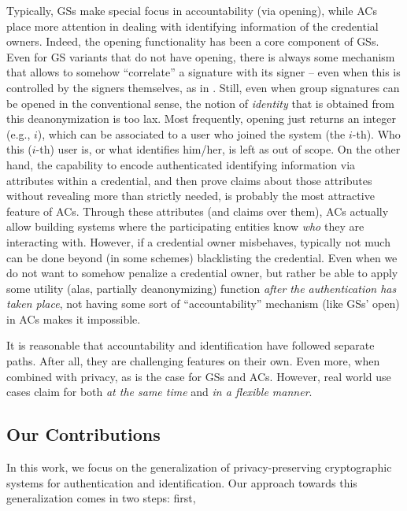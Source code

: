 Typically, GSs make special focus in accountability (via opening), while ACs
place more attention in dealing with identifying information of the credential
owners.
%
Indeed, the opening functionality has been a core component of GSs. Even for
GS variants that do not have opening, there is always some mechanism that
allows to somehow ``correlate'' a signature with its signer -- even when this is
controlled by the signers themselves, as in \cite{dl21} \needcite. Still, even
when group signatures can be opened in the conventional sense, the notion of
\emph{identity} that is obtained from this deanonymization is too lax. Most
frequently, opening just returns an integer (e.g., $i$), which can
be associated to a user who joined the system (the $i$-th). Who this ($i$-th)
user is, or what identifies him/her, is left as out of scope.
%
On the other hand, the capability to encode authenticated identifying
information via attributes within a credential, and then prove claims about
those attributes without revealing more than strictly needed, is probably the
most attractive feature of ACs. Through these attributes (and claims over
them), ACs actually allow building systems where the participating entities
know \emph{who} they are interacting with. However, if a credential owner
misbehaves, typically not much can be done beyond (in some schemes) blacklisting
the credential. Even when we do not want to somehow penalize a credential owner,
but rather be able to apply some utility (alas, partially deanonymizing)
function \emph{after the authentication has taken place}, not having some sort
of ``accountability'' mechanism (like GSs' open) in ACs makes it impossible.

It is reasonable that accountability and identification have followed separate
paths. After all, they are challenging features on their own. Even more, when
combined with privacy, as is the case for GSs and ACs. However, real world use
cases claim for both \emph{at the same time} and \emph{in a flexible manner}.
\fi

\subsection{Our Contributions}
\label{ssec:contributions}

In this work, we focus on the generalization of privacy-preserving cryptographic
systems for authentication and identification. Our approach towards this
generalization comes in two steps: first, 


